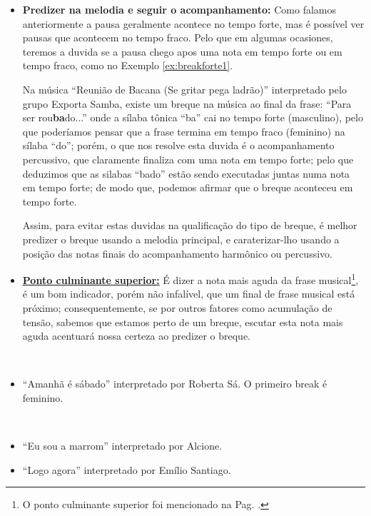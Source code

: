 \begin{itemize}
\item \textbf{Predizer na melodia e seguir o acompanhamento:}
Como falamos anteriormente a pausa geralmente acontece no tempo forte,
mas é possível ver pausas que acontecem no tempo fraco. 
Pelo que em algumas ocasiones, 
teremos a duvida se a pausa chego apos uma nota em tempo forte ou em tempo fraco,
como no Exemplo \ref{ex:breakforte1}.
\begin{example}
\label{ex:breakforte1}
Na música ``Reunião de Bacana (Se gritar pega ladrão)'' interpretado pelo grupo Exporta Samba,
existe um breque na música ao final da frase: ``Para ser rou\textbf{ba}do...''
onde a sílaba tônica ``ba'' cai no tempo forte (masculino), 
pelo que poderíamos pensar que a frase termina em tempo fraco (feminino) na sílaba ``do'';
porém, o que nos resolve esta duvida é o acompanhamento percussivo, 
que claramente finaliza com uma nota em tempo forte;
pelo que deduzimos que as silabas ``bado'' estão sendo executadas juntas numa nota em tempo forte;
de modo que, podemos afirmar que o breque aconteceu em tempo forte.
\end{example}
Assim, para evitar estas duvidas na qualificação do tipo de breque,
é melhor predizer o breque usando a melodia principal,
e caraterizar-lho usando a posição das notas finais do acompanhamento harmônico ou percussivo.
\item \hyperref[ref:PontoCulminanteSuperior]{\textbf{Ponto culminante superior:}} 
É dizer a nota mais aguda da frase musical\footnote{O 
ponto culminante superior foi mencionado na Pag. \pageref{ref:PontoCulminanteSuperior}.}, 
é um bom indicador, porém não infalível, que um final de frase musical está próximo; 
consequentemente, se por outros fatores como acumulação de tensão,
sabemos que estamos perto de um breque, escutar esta nota mais aguda acentuará nossa certeza ao predizer o breque.


\end{itemize}



\begin{example}~
\label{ex:breakfeminino}
\begin{itemize}
\item ``Amanhã é sábado'' interpretado por Roberta Sá. 
O primeiro break é feminino.
\end{itemize}
\end{example}

\begin{example}~
\label{ex:breaksincopados}
\begin{itemize}
\item ``Eu sou a marrom'' interpretado por Alcione.
\item ``Logo agora'' interpretado por Emílio Santiago.
\end{itemize}
\end{example}

